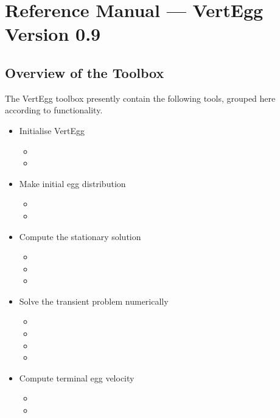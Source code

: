 
\chapter{Reference Manual --- VertEgg Version 0.9}

\section{Overview of the Toolbox}

The VertEgg toolbox  presently contain  the following tools,
grouped here according to functionality.

\begin{itemize}
  \item Initialise VertEgg
    \begin{itemize}
      \item {}
      \item {}
    \end{itemize}  
  \item Make initial egg distribution
    \begin{itemize}
      \item {}
      \item {}
    \end{itemize}  
  \item Compute the stationary solution
    \begin{itemize}
      \item {}
      \item {}
      \item {}
    \end{itemize}  
  \item Solve the transient problem numerically
    \begin{itemize}
      \item {}
      \item {}
      \item {}
      \item {}
    \end{itemize} 
  \item Compute terminal egg velocity
    \begin{itemize}
      \item {}
      \item {}

\end{itemize}
\end{itemize}
